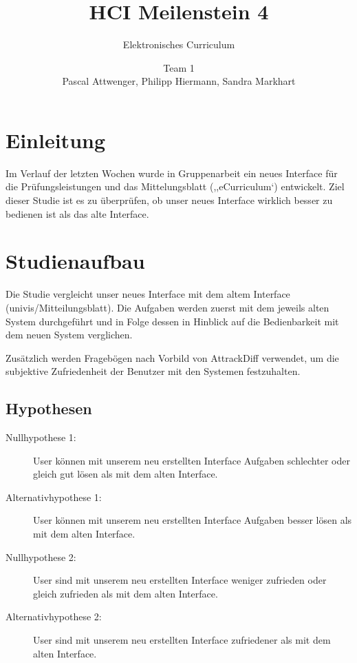\documentclass[a4paper,10pt]{scrartcl}
\title{HCI Meilenstein 4}
\subtitle{Elektronisches Curriculum}
\author{Team 1 \\Pascal Attwenger, Philipp Hiermann, Sandra Markhart}
\begin{document}
\maketitle

\section{Einleitung}

Im Verlauf der letzten Wochen wurde in Gruppenarbeit ein neues Interface für die Prüfungsleistungen und das Mittelungsblatt (,,eCurriculum`) entwickelt.
Ziel dieser Studie ist es zu überprüfen, ob unser neues Interface wirklich besser zu bedienen ist als das alte Interface.

\section{Studienaufbau} 

Die Studie vergleicht unser neues Interface mit dem altem Interface (univis/Mitteilungsblatt). Die Aufgaben werden zuerst mit dem jeweils alten System durchgeführt und in Folge dessen in Hinblick auf die Bedienbarkeit mit dem neuen System verglichen.

Zusätzlich werden Fragebögen nach Vorbild von AttrackDiff verwendet, um die subjektive Zufriedenheit der Benutzer mit den Systemen festzuhalten.

\subsection{Hypothesen}


\begin{description}
 \item[Nullhypothese 1: ] User können mit unserem neu erstellten Interface Aufgaben schlechter oder gleich gut lösen als mit dem alten Interface. 
 \item[Alternativhypothese 1: ] User können mit unserem neu erstellten Interface Aufgaben besser lösen als mit dem alten Interface. 
\end{description}

\begin{description}
 \item[Nullhypothese 2: ] User sind mit unserem neu erstellten Interface weniger zufrieden oder gleich zufrieden als mit dem alten Interface. 
 \item[Alternativhypothese 2: ] User sind mit unserem neu erstellten Interface zufriedener als mit dem alten Interface. 
\end{description}
\end{document}

